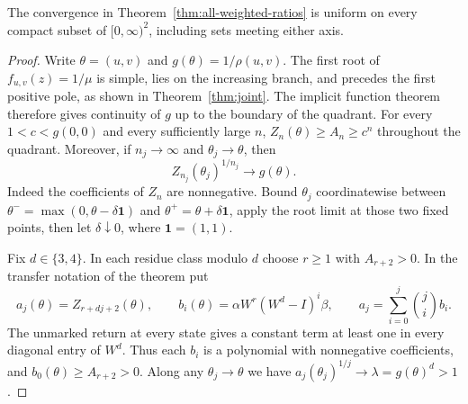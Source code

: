 \begin{corollary}\label{cor:uniform-weighted-ratios}
The convergence in Theorem~\ref{thm:all-weighted-ratios} is uniform on
every compact subset of \([0,\infty)^2\), including sets meeting either
axis.
\end{corollary}
\begin{proof}
Write \(\theta=(u,v)\) and \(g(\theta)=1/\rho(u,v)\).
The first root of \(f_{u,v}(z)=1/\mu\) is simple, lies on the
increasing branch, and precedes the first positive pole, as shown in
Theorem~\ref{thm:joint}. The implicit function theorem therefore gives
continuity of \(g\) up to the boundary of the quadrant. For every
\(1<c<g(0,0)\) and every sufficiently large \(n\),
\(Z_n(\theta)\ge A_n\ge c^n\) throughout the quadrant.
Moreover, if \(n_j\to\infty\) and \(\theta_j\to\theta\), then
\[
       Z_{n_j}(\theta_j)^{1/n_j}\longrightarrow g(\theta).
\]
Indeed the coefficients of \(Z_n\) are nonnegative. Bound
\(\theta_j\) coordinatewise between
\(\theta^-=\max(0,\theta-\delta\mathbf 1)\) and
\(\theta^+=\theta+\delta\mathbf 1\), apply the root limit at those two
fixed points, then let \(\delta\downarrow0\), where \(\mathbf 1=(1,1)\).

Fix \(d\in\{3,4\}\). In each residue class modulo \(d\) choose
\(r\ge1\) with \(A_{r+2}>0\). In the transfer notation of the theorem put
\[
 a_j(\theta)=Z_{r+dj+2}(\theta),\qquad
 b_i(\theta)=\alpha W^r(W^d-I)^i\beta,\qquad
 a_j=\sum_{i=0}^j\binom ji b_i .
\]
The unmarked return at every state gives a constant term at least one
in every diagonal entry of \(W^d\). Thus each \(b_i\) is a polynomial
with nonnegative coefficients, and
\(b_0(\theta)\ge A_{r+2}>0\). Along any \(\theta_j\to\theta\) we have
\(a_j(\theta_j)^{1/j}\to\lambda=g(\theta)^d>1\).


\end{proof}
